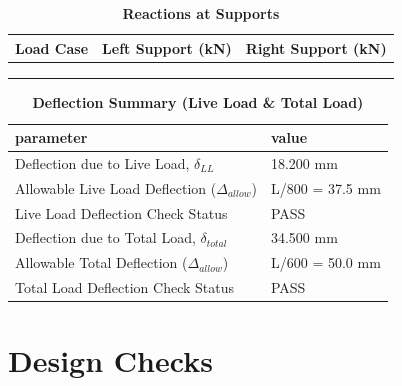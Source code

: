 \documentclass[12pt,a4paper]{report}
\numberwithin{table}{chapter}
\numberwithin{figure}{chapter}
\begin{document}
\endgroup

\vspace{1em}
\begin{longtable}{|>{\centering\arraybackslash}p{5.2cm}|>{\centering\arraybackslash}p{5.2cm}|>{\centering\arraybackslash}p{5.2cm}|}
\caption{\textbf{Reactions at Supports}}
\hline
\textbf{Load Case} & \textbf{Left Support (kN)} & \textbf{Right Support (kN)} \\[6pt]
\hline
 &  &  \\[6pt]
\hline
 &  &  \\[6pt]
\hline
 &  &  \\[6pt]
\hline
\end{longtable}

\vspace{1em}
\begin{longtable}{|L{7cm}|p{8.5cm}|}
\caption{\textbf{Deflection Summary (Live Load \& Total Load)}}
\hline
\textbf{parameter} & \textbf{value} \\
\hline
\textnormal{Deflection due to Live Load, $\delta_{LL}$} & 18.200 mm \\[6pt]
\hline
\textnormal{Allowable Live Load Deflection ($\Delta_{allow}$)} & L/800 = 37.5 mm \\[6pt]
\hline
\textnormal{Live Load Deflection Check Status} & PASS \\[6pt]
\hline
\textnormal{Deflection due to Total Load, $\delta_{total}$} & 34.500 mm \\[6pt]
\hline
\textnormal{Allowable Total Deflection ($\Delta_{allow}$)} & L/600 = 50.0 mm \\[6pt]
\hline
\textnormal{Total Load Deflection Check Status} & PASS \\[6pt]
\hline
\end{longtable}

\vspace{1em}
\noindent
\noindent{}
\noindent{}
\noindent{}


\chapter{Design Checks}
\end{document}
